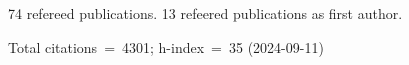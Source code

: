 74 refereed publications. 13 refeered publications as first author.

Total citations~=~4301; h-index~=~35 (2024-09-11)